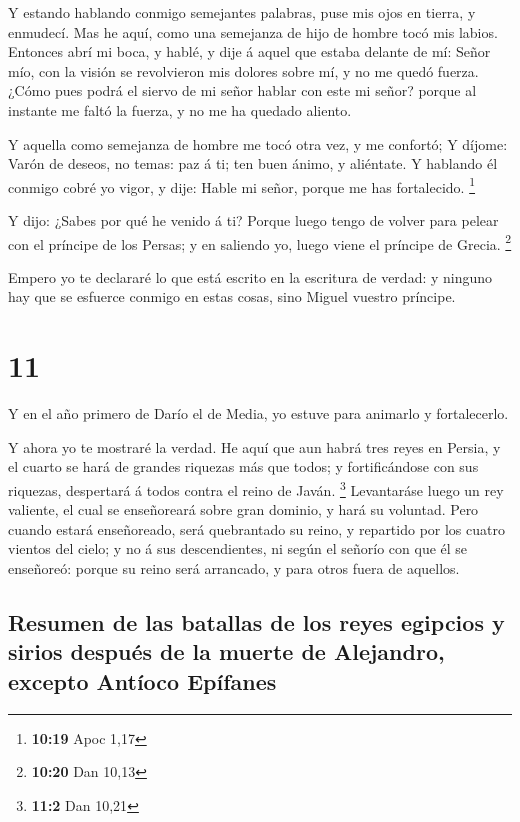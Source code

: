  Y estando hablando conmigo semejantes palabras, puse mis
ojos en tierra, y enmudecí.  Mas he aquí, como una
semejanza de hijo de hombre tocó mis labios. Entonces abrí mi boca, y
hablé, y dije á aquel que estaba delante de mí: Señor mío, con la visión
se revolvieron mis dolores sobre mí, y no me quedó fuerza. 
¿Cómo pues podrá el siervo de mi señor hablar con este mi señor? porque
al instante me faltó la fuerza, y no me ha quedado aliento.

 Y aquella como semejanza de hombre me tocó otra vez, y me
confortó;  Y díjome: Varón de deseos, no temas: paz á ti;
ten buen ánimo, y aliéntate. Y hablando él conmigo cobré yo vigor, y
dije: Hable mi señor, porque me has fortalecido. \footnote{\textbf{10:19}
  Apoc 1,17}

 Y dijo: ¿Sabes por qué he venido á ti? Porque luego tengo
de volver para pelear con el príncipe de los Persas; y en saliendo yo,
luego viene el príncipe de Grecia. \footnote{\textbf{10:20} Dan 10,13}

 Empero yo te declararé lo que está escrito en la escritura
de verdad: y ninguno hay que se esfuerce conmigo en estas cosas, sino
Miguel vuestro príncipe.

\hypertarget{section-10}{%
\section{11}\label{section-10}}

 Y en el año primero de Darío el de Media, yo estuve para
animarlo y fortalecerlo.

 Y ahora yo te mostraré la verdad. He aquí que aun habrá
tres reyes en Persia, y el cuarto se hará de grandes riquezas más que
todos; y fortificándose con sus riquezas, despertará á todos contra el
reino de Javán. \footnote{\textbf{11:2} Dan 10,21} 
Levantaráse luego un rey valiente, el cual se enseñoreará sobre gran
dominio, y hará su voluntad.  Pero cuando estará
enseñoreado, será quebrantado su reino, y repartido por los cuatro
vientos del cielo; y no á sus descendientes, ni según el señorío con que
él se enseñoreó: porque su reino será arrancado, y para otros fuera de
aquellos.

\hypertarget{resumen-de-las-batallas-de-los-reyes-egipcios-y-sirios-despuuxe9s-de-la-muerte-de-alejandro-excepto-antuxedoco-epuxedfanes}{%
\subsection{Resumen de las batallas de los reyes egipcios y sirios
después de la muerte de Alejandro, excepto Antíoco
Epífanes}\label{resumen-de-las-batallas-de-los-reyes-egipcios-y-sirios-despuuxe9s-de-la-muerte-de-alejandro-excepto-antuxedoco-epuxedfanes}}

